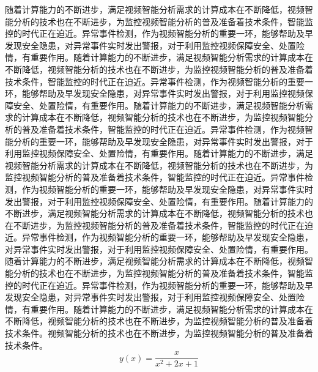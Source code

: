   随着计算能力的不断进步，满足视频智能分析需求的计算成本在不断降低，视频智能分析的技术也在不断进步，为监控视频智能分析的普及准备着技术条件，智能监控的时代正在迫近。异常事件检测，作为视频智能分析的重要一环，能够帮助及早发现安全隐患，对异常事件实时发出警报，对于利用监控视频保障安全、处置险情，有重要作用。随着计算能力的不断进步，满足视频智能分析需求的计算成本在不断降低，视频智能分析的技术也在不断进步，为监控视频智能分析的普及准备着技术条件，智能监控的时代正在迫近。异常事件检测，作为视频智能分析的重要一环，能够帮助及早发现安全隐患，对异常事件实时发出警报，对于利用监控视频保障安全、处置险情，有重要作用。随着计算能力的不断进步，满足视频智能分析需求的计算成本在不断降低，视频智能分析的技术也在不断进步，为监控视频智能分析的普及准备着技术条件，智能监控的时代正在迫近。异常事件检测，作为视频智能分析的重要一环，能够帮助及早发现安全隐患，对异常事件实时发出警报，对于利用监控视频保障安全、处置险情，有重要作用。随着计算能力的不断进步，满足视频智能分析需求的计算成本在不断降低，视频智能分析的技术也在不断进步，为监控视频智能分析的普及准备着技术条件，智能监控的时代正在迫近。异常事件检测，作为视频智能分析的重要一环，能够帮助及早发现安全隐患，对异常事件实时发出警报，对于利用监控视频保障安全、处置险情，有重要作用。随着计算能力的不断进步，满足视频智能分析需求的计算成本在不断降低，视频智能分析的技术也在不断进步，为监控视频智能分析的普及准备着技术条件，智能监控的时代正在迫近。异常事件检测，作为视频智能分析的重要一环，能够帮助及早发现安全隐患，对异常事件实时发出警报，对于利用监控视频保障安全、处置险情，有重要作用。随着计算能力的不断进步，满足视频智能分析需求的计算成本在不断降低，视频智能分析的技术也在不断进步，为监控视频智能分析的普及准备着技术条件，智能监控的时代正在迫近。异常事件检测，作为视频智能分析的重要一环，能够帮助及早发现安全隐患，对异常事件实时发出警报，对于利用监控视频保障安全、处置险情，有重要作用。随着计算能力的不断进步，满足视频智能分析需求的计算成本在不断降低，视频智能分析的技术也在不断进步，为监控视频智能分析的普及准备着技术条件。视频智能分析的技术也在不断进步，为监控视频智能分析的普及准备着技术条件。
  \begin{equation}\label{eq:eg:atbottom}
  y(x)=\frac{x}{x^2+2x+1}
  \end{equation}
